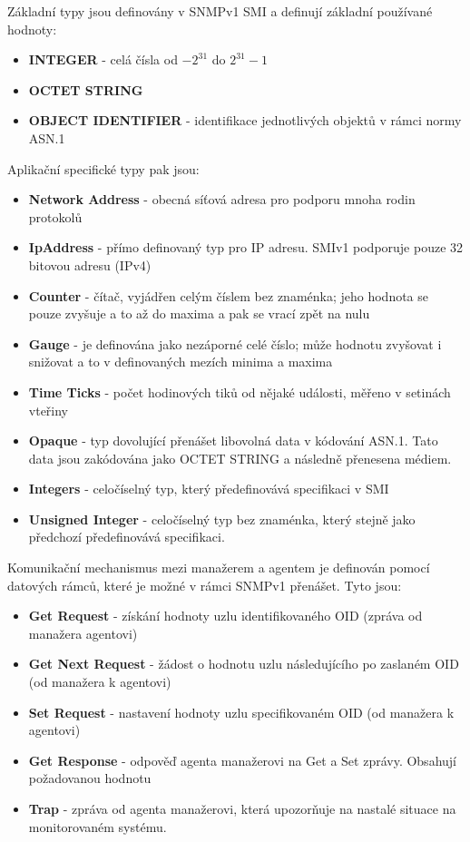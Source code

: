 Základní typy jsou definovány v SNMPv1 SMI a definují základní používané hodnoty:
\begin{itemize}
	\item \textbf{INTEGER} - celá čísla od $ -2^{31} $ do $ 2^{31}-1$
	\item \textbf{OCTET STRING}
	\item \textbf{OBJECT IDENTIFIER} - identifikace jednotlivých objektů v rámci normy ASN.1
\end{itemize}

Aplikační specifické typy pak jsou:
\begin{itemize}
	\item \textbf{Network Address} - obecná síťová adresa pro podporu mnoha rodin protokolů
	\item \textbf{IpAddress} - přímo definovaný typ pro IP adresu. SMIv1 podporuje pouze 32 bitovou adresu (IPv4)
	\item \textbf{Counter} - čítač, vyjádřen celým číslem bez znaménka; jeho hodnota se pouze zvyšuje a to až do maxima a pak se vrací zpět na nulu
	\item \textbf{Gauge} - je definována jako nezáporné celé číslo; může hodnotu zvyšovat i snižovat a to v definovaných mezích minima a maxima
	\item \textbf{Time Ticks} - počet hodinových tiků od nějaké události, měřeno v setinách vteřiny
	\item \textbf{Opaque} - typ dovolující přenášet libovolná data v kódování ASN.1. Tato data jsou zakódována jako OCTET STRING a následně přenesena médiem.
	\item \textbf{Integers} - celočíselný typ, který předefinovává specifikaci v SMI
	\item \textbf{Unsigned Integer} - celočíselný typ bez znaménka, který stejně jako předchozí předefinovává specifikaci.
\end{itemize}

Komunikační mechanismus mezi manažerem a agentem je definován pomocí datových rámců, které je možné v rámci SNMPv1 přenášet. Tyto jsou:
\begin{itemize}
	\item \textbf{Get Request} - získání hodnoty uzlu identifikovaného OID (zpráva od manažera agentovi)
	\item \textbf{Get Next Request} - žádost o hodnotu uzlu následujícího po zaslaném OID (od manažera k agentovi)
	\item \textbf{Set Request} - nastavení hodnoty uzlu specifikovaném OID (od manažera k agentovi) 
	\item \textbf{Get Response} - odpověď agenta manažerovi na Get a Set zprávy. Obsahují požadovanou hodnotu
	\item \textbf{Trap} - zpráva od agenta manažerovi, která upozorňuje na nastalé situace na monitorovaném systému.
\end{itemize}

